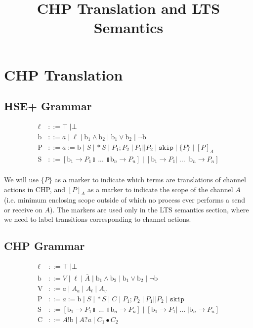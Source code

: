 \documentclass{article}
\begin{document}
\title{CHP Translation and LTS Semantics}
\author{}
\maketitle

\section{CHP Translation}

\subsection{HSE+ Grammar}
\begin{align*}
    \ell & ::= \top \; | \bot \\
    \mathrm{b} & ::= a \; | \; \ell \; | \; \mathrm{b}_1 \wedge \mathrm{b}_2 \; | \; \mathrm{b}_1 \vee \mathrm{b}_2 \; | \; \lnot \mathrm{b} \\
    \mathrm{P} & ::= a := \mathrm{b} \; | \; S \; | \, *S \; | \; P_1; P_2 \; | \: P_1 || P_2 \; | \; \mathtt{skip} \; | \; \{P\} \; | \; [P]_A \\
    \mathrm{S} & ::= [ \mathrm{b}_1 \rightarrow P_1 \talloblong \; ... \; \talloblong \mathrm{b}_n \rightarrow P_n ] \; | \; [ \mathrm{b}_1 \rightarrow P_1 | \; ... \; | \mathrm{b}_n \rightarrow P_n ] \\
\end{align*}

We will use $\{P\}$ as a marker to indicate which terms are translations of channel actions in CHP, and $[P]_A$ as a marker to indicate the scope of the channel $A$ (i.e. minimum enclosing scope outside of which no process ever performs a send or receive on $A$).
The markers are used only in the LTS semantics section, where we need to label transitions corresponding to channel actions.

\subsection{CHP Grammar}
\begin{align*}
    \ell & ::= \top \; | \bot \\
    \mathrm{b} & ::= V \; | \; \ell \; | \; \overline{A} \; | \; \mathrm{b}_1 \wedge \mathrm{b}_2 \; | \; \mathrm{b}_1 \vee \mathrm{b}_2 \; | \; \lnot \mathrm{b} \\
    \mathrm{V} & ::= a \; | \; A_a \; | \; A_t \; | \; A_v \\
    \mathrm{P} & ::= a := \mathrm{b} \; | \; S \; | \, *S \; | \; C \; | \; P_1; P_2 \; | \: P_1 || P_2 \; | \; \mathtt{skip} \\
    \mathrm{S} & ::= [ \mathrm{b}_1 \rightarrow P_1 \talloblong \; ... \; \talloblong \mathrm{b}_n \rightarrow P_n ] \; | \; [ \mathrm{b}_1 \rightarrow P_1 | \; ... \; | \mathrm{b}_n \rightarrow P_n ] \\
    \mathrm{C} & ::= A!\mathrm{b} \; | \; A?a \; | \; C_1 \bullet C_2
\end{align*}
\end{document}
